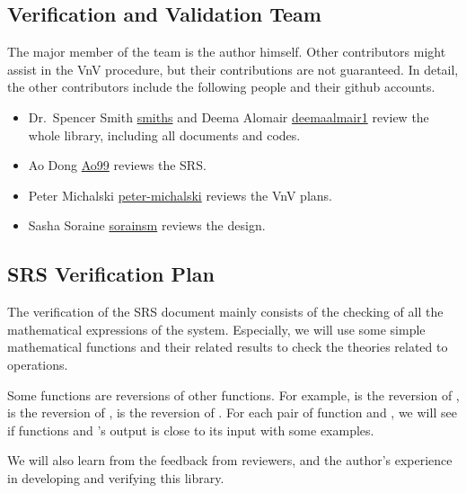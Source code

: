 \documentclass[12pt, titlepage]{article}
\begin{document}
\subsection{Verification and Validation Team}\label{sbsc:VnVTeam}

The major member of the team is the author himself. Other contributors might
assist in the VnV procedure, but their contributions are not
guaranteed.
In detail, the other contributors include the following people and their github accounts.
\begin{itemize}
	\item Dr.~Spencer Smith \href{https://github.com/smiths}{smiths} and Deema Alomair \href{https://github.com/deemaalomair1}{deemaalmair1} review the whole library, including all documents and codes.
	\item Ao Dong \href{https://github.com/Ao99}{Ao99} reviews the SRS.
	\item Peter Michalski \href{https://github.com/peter-michalski}{peter-michalski} reviews the VnV plans.
	\item Sasha Soraine \href{https://github.com/sorainsm}{sorainsm} reviews the design.
\end{itemize}


\subsection{SRS Verification Plan}
\label{sbsc:SRSVnVPlan}

The verification of the SRS document mainly consists of the checking of all the mathematical expressions of the system. Especially, we will use some simple mathematical functions and their related results to check the theories related to operations.

Some functions are reversions of other functions. For example,  is the reversion of ,  is the reversion of ,  is the reversion of . For each pair of function  and , we will see if functions  and 's output is close to its input with some examples. 

We will also learn from the feedback from
reviewers, and the author's experience in developing and verifying this
library. 
\end{document}
